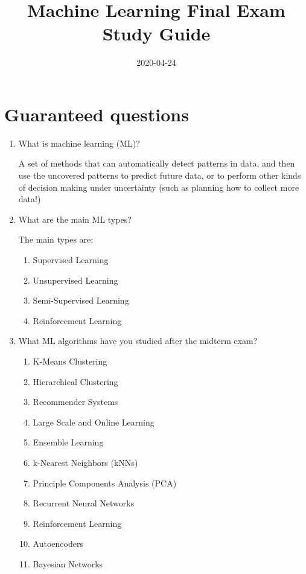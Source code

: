 \documentclass[12pt]{article}
\title{Machine Learning Final Exam Study Guide}
\date{2020-04-24}
\newenvironment{QandA}{\begin{enumerate}[label=\bfseries\arabic*.]\bfseries}
{\end{enumerate}}
\newenvironment{answered}{\par\normalfont\color{Sepia}}{}
\begin{document}
\noindent%

\section*{Guaranteed questions}
\begin{QandA}
    \item What is machine learning (ML)?
    \begin{answered}
        A set of methods that can automatically detect patterns in
        data, and then use the uncovered patterns to predict future
        data, or to perform other kinds of decision making under
        uncertainty (such as planning how to collect more data!)
    \end{answered}

    \item What are the main ML types?
    \begin{answered}
        The main types are:
        \begin{enumerate}
            \item Supervised Learning
            \item Unsupervised Learning
            \item Semi-Supervised Learning
            \item Reinforcement Learning
        \end{enumerate}
    \end{answered}

    \item What ML algorithms have you studied after the midterm exam?
    \begin{answered}
        \begin{enumerate}
        \item K-Means Clustering
        \item Hierarchical Clustering
        \item Recommender Systems
        \item Large Scale and Online Learning
        \item Ensemble Learning
        \item k-Nearest Neighbors (kNNs)
        \item Principle Components Analysis (PCA)
        \item Recurrent Neural Networks
        \item Reinforcement Learning
        \item Autoencoders
        \item Bayesian Networks
        \end{enumerate}
    \end{answered}


\end{QandA}
\end{document}
